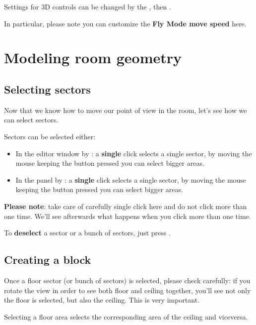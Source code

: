 Settings for 3D controls can be changed by the , then .
\par In particular, please note you can customize the \textbf{Fly Mode move speed} here.

\chapter{Modeling room geometry}

\section{Selecting sectors}

Now that we know how to move our point of view in the room, let's see how we can select sectors.
\par Sectors can be selected either:
\begin{itemize}
\item In the editor window by : a \textbf{single} click selects a single sector, by moving the mouse keeping the button pressed you can select bigger areas.
\item In the  panel by : a \textbf{single} click selects a single sector, by moving the mouse keeping the button pressed you can select bigger areas.
\end{itemize}

\textbf{Please note}: take care of carefully single click here and do not click more than one time. We'll see afterwards what happens when you click more than one time.

\par To \textbf{deselect} a sector or a bunch of sectors, just press .

\section{Creating a block}

Once a floor sector (or bunch of sectors) is selected, please check carefully: if you rotate the view in order to see both floor and ceiling together, you'll see not only the floor is selected, but also the ceiling. This is very important.

\begin{remark}
    Selecting a floor area selects the corresponding area of the ceiling and viceversa.
\end{remark}

